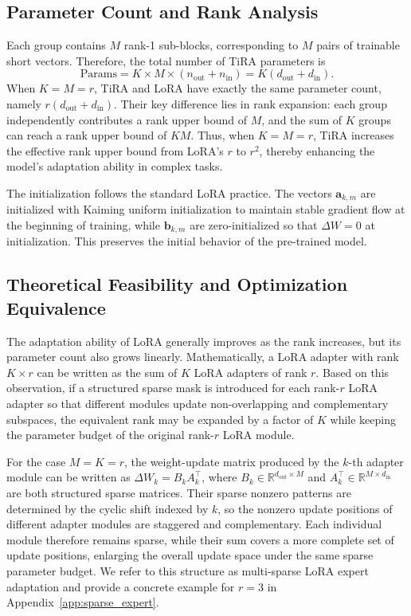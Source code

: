\documentclass[a4paper,11pt]{article}
\newcommand{\R}{\mathbb{R}}
\newcommand{\DeltaW}{\Delta W}
\begin{document}
\subsection{Parameter Count and Rank Analysis}

Each group contains $M$ rank-1 sub-blocks, corresponding to $M$ pairs of trainable short vectors. Therefore, the total number of TiRA parameters is
\begin{equation}
    \mathrm{Params}=K\times M\times(n_{\mathrm{out}}+n_{\mathrm{in}})=K(d_{\mathrm{out}}+d_{\mathrm{in}}).
\end{equation}
When $K=M=r$, TiRA and LoRA have exactly the same parameter count, namely $r(d_{\mathrm{out}}+d_{\mathrm{in}})$. Their key difference lies in rank expansion: each group independently contributes a rank upper bound of $M$, and the sum of $K$ groups can reach a rank upper bound of $KM$. Thus, when $K=M=r$, TiRA increases the effective rank upper bound from LoRA's $r$ to $r^2$, thereby enhancing the model's adaptation ability in complex tasks.

The initialization follows the standard LoRA practice. The vectors $\bm{a}_{k,m}$ are initialized with Kaiming uniform initialization \cite{he2015rectifier} to maintain stable gradient flow at the beginning of training, while $\bm{b}_{k,m}$ are zero-initialized so that $\DeltaW=0$ at initialization. This preserves the initial behavior of the pre-trained model.

\subsection{Theoretical Feasibility and Optimization Equivalence}

The adaptation ability of LoRA generally improves as the rank increases, but its parameter count also grows linearly. Mathematically, a LoRA adapter with rank $K\times r$ can be written as the sum of $K$ LoRA adapters of rank $r$. Based on this observation, if a structured sparse mask is introduced for each rank-$r$ LoRA adapter so that different modules update non-overlapping and complementary subspaces, the equivalent rank may be expanded by a factor of $K$ while keeping the parameter budget of the original rank-$r$ LoRA module.

For the case $M=K=r$, the weight-update matrix produced by the $k$-th adapter module can be written as $\Delta W_k=B_kA_k^{\top}$, where $B_k\in\R^{d_{\mathrm{out}}\times M}$ and $A_k^{\top}\in\R^{M\times d_{\mathrm{in}}}$ are both structured sparse matrices. Their sparse nonzero patterns are determined by the cyclic shift indexed by $k$, so the nonzero update positions of different adapter modules are staggered and complementary. Each individual module therefore remains sparse, while their sum covers a more complete set of update positions, enlarging the overall update space under the same sparse parameter budget. We refer to this structure as multi-sparse LoRA expert adaptation and provide a concrete example for $r=3$ in Appendix~\ref{app:sparse_expert}.
\end{document}
